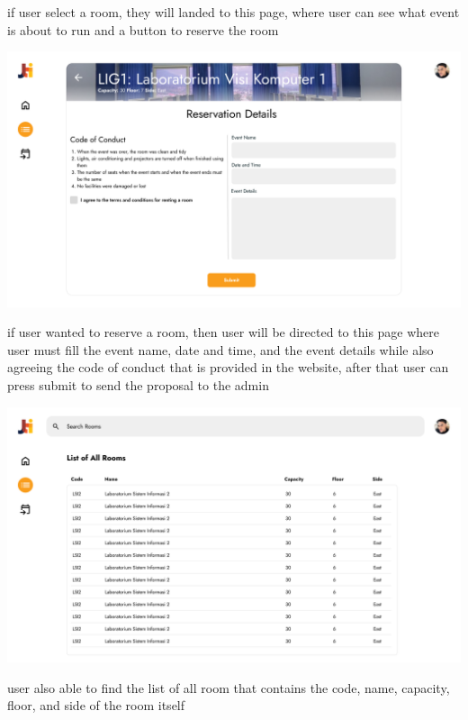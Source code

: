 \documentclass[12pt,titlepage,a4paper]{report}
\begin{document}
    if user select a room, they will landed to this page, where user can see what event is about to run and a button to reserve the room
    \begin{center}
        \includegraphics[width=\textwidth]{images/figures/UIUX/reserve_rev.png}\\
    \end{center}
    if user wanted to reserve a room, then user will be directed to this page where user must fill the event name, date and time, and the event details while also agreeing the code of conduct that is provided in the website, after that user can press submit to send the proposal to the admin
    \begin{center}
        \includegraphics[width=\textwidth]{images/figures/UIUX/list.png}\\
    \end{center}
    user also able to find the list of all room that contains the code, name, capacity, floor, and side of the room itself
\end{document}
